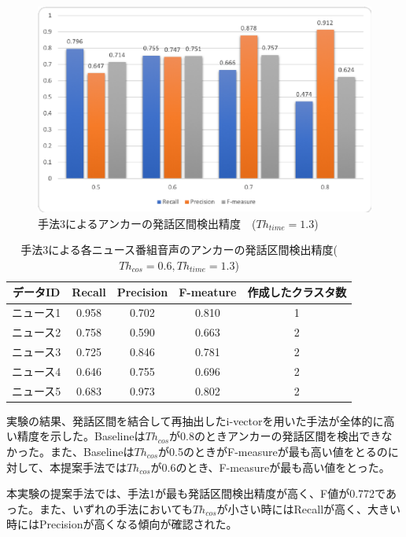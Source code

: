 \begin{figure}[H]
  \begin{center}
    \includegraphics[scale=0.8]{./figure/get_anchor_prob3.eps}
  \end{center}
  \caption{手法3によるアンカーの発話区間検出精度　($Th_{time}=1.3$) \label{fig:result_anchor_prob3}}
\end{figure}

\begin{table}[H]
  \begin{center}
    \caption{手法3による各ニュース番組音声のアンカーの発話区間検出精度($Th_{cos}=0.6,Th_{time}=1.3$) \label{table:NHK_pause_RPF}}
    \begin{tabular}{|c||c|c|c|c|} \hline
データID & Recall & Precision & F-meature & 作成したクラスタ数\\ \hline
ニュース1 & 0.958 & 0.702 & 0.810 & 1 \\ \hline
ニュース2 & 0.758 & 0.590 & 0.663 & 2 \\ \hline
ニュース3 & 0.725 & 0.846 & 0.781 & 2 \\ \hline
ニュース4 & 0.646 & 0.755 & 0.696 & 2 \\ \hline
ニュース5 & 0.683 & 0.973 & 0.802 & 2 \\ \hline
    \end{tabular}
  \end{center}
\end{table}

実験の結果、発話区間を結合して再抽出したi-vectorを用いた手法が全体的に高い精度を示した。Baselineは$Th_{cos}$が0.8のときアンカーの発話区間を検出できなかった。また、Baselineは$Th_{cos}$が0.5のときがF-measureが最も高い値をとるのに対して、本提案手法では$Th_{cos}$が0.6のとき、F-measureが最も高い値をとった。\par
本実験の提案手法では、手法1が最も発話区間検出精度が高く、F値が0.772であった。また、いずれの手法においても$Th_{cos}$が小さい時にはRecallが高く、大きい時にはPrecisionが高くなる傾向が確認された。

